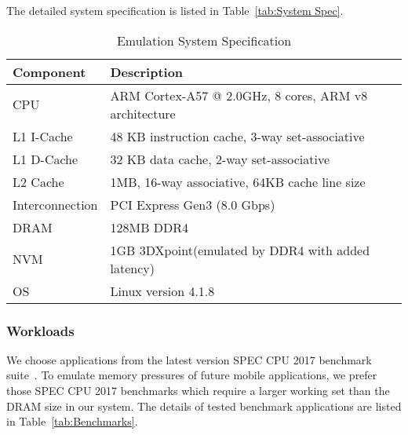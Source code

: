 \documentclass[conference]{IEEEtran}
\begin{document}
The
detailed system specification is listed in Table~\ref{tab:System
  Spec}.
\begin{table}[hpbt]
\centering
\settowidth{}
\caption{Emulation System Specification}
\begin{tabulary}{\columnwidth}{L|L}
  \hline
  {\textbf{Component}} & Description \\
  \hline
  CPU & ARM Cortex-A57 @ 2.0GHz, 8 cores, ARM v8 architecture\\
  \hline
  L1 I-Cache & 48 KB instruction cache, 3-way set-associative\\
  \hline
  L1 D-Cache & 32 KB data cache, 2-way set-associative\\
  \hline
  L2 Cache & 1MB, 16-way associative, 64KB cache line size \\
  \hline
  Interconnection & PCI Express Gen3 (8.0 Gbps) \\
  \hline
   DRAM & 128MB DDR4\\
   \hline
   NVM & 1GB 3DXpoint(emulated by DDR4 with added latency) \\
\hline
OS & Linux version 4.1.8 \\
\hline
\end{tabulary}
\label{tab:System Spec}
\end{table}





\subsubsection{Workloads}
We choose applications from the latest version SPEC CPU 2017 benchmark suite~\cite{SPEC_Official}.  To emulate memory pressures of future mobile applications, we
prefer those SPEC CPU 2017 benchmarks which require a larger
working set than the DRAM size in our system.  The details of tested benchmark applications are
listed in Table~\ref{tab:Benchmarks}.
\end{document}

